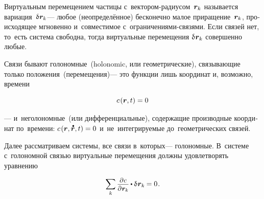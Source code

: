 \begin{otherlanguage}{russian}

Виртуальным перемещением частицы с~вектором\hbox{-}радиусом~${\bm{r}_k}$ называется вариация~${\variation{\hspace{.1ex}\locationvector_k}}$\:--- %
любое (неопределённое) бесконечно малое приращение~${\bm{r}_k}$, происходящее мгновенно %
и~совместимое с~ограничениями\hbox{-}связями. %
Если связей нет, то~есть система свободна, тогда виртуальные перемещения ${\variation{\hspace{.1ex}\locationvector_k}}$ совершенно любые.

Связи бывают голономные~(holonomic, или геометрические), связывающие только положения~(перемещения)\:--- это функции лишь координат и, возможно, времени

\nopagebreak\vspace{-0.1em}\begin{equation}\label{holonomicconstraint}
c\hspace{.2ex}(\bm{r}, t) = 0
\end{equation}

\vspace{-0.12em} \noindent --- и~неголономные~(или дифференциальные), содержащие производные координат по~времени: ${c\hspace{.2ex}(\locationvector, \mathdotabove{\locationvector}, t) = 0}$ и~не~интегрируемые до~геометрических связей.

Далее рассматриваем системы, все связи в~которых\:--- голономные.
В~системе с~голономной связью виртуальные перемещения должны удовлетворять уравнению

\nopagebreak\vspace{-0.1em}\begin{equation}\label{requirementforvirtualdisplacements}
\displaystyle \sum_k \scalebox{0.92}{$\displaystyle \frac{\raisemath{-0.12em}{\partial \hspace{.1ex} c}}{\partial \hspace{.1ex} \locationvector_k}$} \hspace{-0.1ex} \dotp \variation{\hspace{.1ex}\locationvector_k} \hspace{-0.1ex} = 0 \hspace{.16ex}.
\vspace{-0.25em}\end{equation}


\end{otherlanguage}
